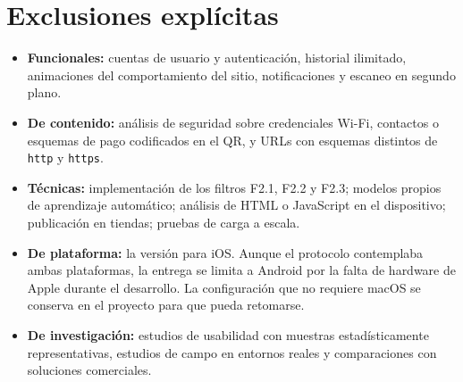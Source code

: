 \section{Exclusiones explícitas}

\begin{itemize}
	\item \textbf{Funcionales:} cuentas de usuario y autenticación, historial ilimitado, animaciones del comportamiento del sitio, notificaciones y escaneo en segundo plano.
	\item \textbf{De contenido:} análisis de seguridad sobre credenciales Wi-Fi, contactos o esquemas de pago codificados en el QR, y URLs con esquemas distintos de \texttt{http} y \texttt{https}.
	\item \textbf{Técnicas:} implementación de los filtros F2.1, F2.2 y F2.3; modelos propios de aprendizaje automático; análisis de HTML o JavaScript en el dispositivo; publicación en tiendas; pruebas de carga a escala.
	\item \textbf{De plataforma:} la versión para iOS. Aunque el protocolo contemplaba ambas plataformas, la entrega se limita a Android por la falta de hardware de Apple durante el desarrollo. La configuración que no requiere macOS se conserva en el proyecto para que pueda retomarse.
	\item \textbf{De investigación:} estudios de usabilidad con muestras estadísticamente representativas, estudios de campo en entornos reales y comparaciones con soluciones comerciales.
\end{itemize}
